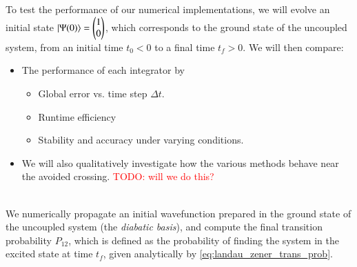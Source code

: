 \documentclass{subfiles}
\begin{document}
To test the performance of our numerical implementations, we will evolve an initial state $\ket{\Psi(0)} = \begin{pmatrix} 1 \\ 0 \end{pmatrix}$, which corresponds to the ground state of the uncoupled system, from an initial time $t_0<0$ to a final time $t_f>0$. We will then compare:
\begin{itemize}
    \item The performance of each integrator by
    \begin{itemize}
        \item Global error vs. time step $\Delta t$.
        \item Runtime efficiency
        \item Stability and accuracy under varying conditions. 
    \end{itemize}
    \item We will also qualitatively investigate how the various methods behave near the avoided crossing. \textcolor{red}{TODO: will we do this?}
\end{itemize}
\\ 

We numerically propagate an initial wavefunction prepared in the ground state of the uncoupled system (the \emph{diabatic basis}), and compute the final transition probability $P_{12}$, which is defined as the probability of finding the system in the excited state at time $t_f$, given analytically by \eqref{eq:landau_zener_trans_prob}. \\
\end{document}
